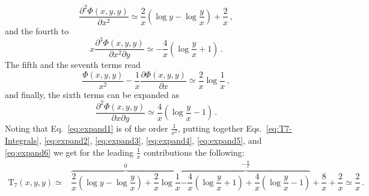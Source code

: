 \documentclass[10pt]{report}
\newcommand{\ro}[1]{\textrm{#1}}
\renewcommand{\(}{\left(}
\renewcommand{\)}{\right)}
\renewcommand{\[}{\left[}
\renewcommand{\]}{\right]}
\newcommand{\del}{\partial}
\begin{document}
\begin{equation}
    \dfrac{\del^2 \Phi(x,y,y)}{\del x^2} \simeq \dfrac{2}{x} \left( \log y - \log \dfrac{y}{x} \right) + \dfrac{2}{x} \,,
    \label{eq:expand3}
\end{equation}
and the fourth to
\begin{equation}
    x \dfrac{\del^3 \Phi(x,y,y)}{\del x^2 \del y} \simeq -\dfrac{4}{x}\left(\log \dfrac{y}{x} + 1 \right)\,.
    \label{eq:expand4}
\end{equation}
The fifth and the seventh terms read
\begin{equation}
    \dfrac{\Phi(x,y,y)}{x^2}
    -\dfrac{1}{x} \dfrac{\del \Phi(x,y,y)}{\del x} \simeq \dfrac{2}{x} \log \dfrac{1}{x} \,,
    \label{eq:expand5}
\end{equation}
and finally, the sixth terms can be expanded as
\begin{equation}
    \dfrac{\del^2 \Phi(x,y,y)}{\del x \del y} \simeq \dfrac{4}{x}\left(\log \dfrac{y}{x} -1\right)\,.
    \label{eq:expand6}
\end{equation}
Noting that Eq.~\eqref{eq:expand1} is of the order $\tfrac{1}{x^2}$, putting together Eqs.~\eqref{eq:T7-Integrals}, \eqref{eq:expand2}, \eqref{eq:expand3}, \eqref{eq:expand4}, \eqref{eq:expand5}, and \eqref{eq:expand6} we get for the leading $\tfrac{1}{x}$ contributions the following:
\begin{equation}
    \begin{aligned}
    \ro{T}_7\left(x,y,y\right) \simeq& \overbrace{\dfrac{2}{x} \( \log y - \log \dfrac{y}{x} \) + \dfrac{2}{x} \log \dfrac{1}{x}}^{0} \overbrace{-\dfrac{4}{x}\(\log \dfrac{y}{x} + 1 \) +
    \dfrac{4}{x}\(\log \dfrac{y}{x} -1\)}^{-\tfrac{8}{x}} + \dfrac{8}{x} + \dfrac{2}{x} \simeq \dfrac{2}{x}\,.
    \end{aligned}
    \label{eq:T7-expanded}
\end{equation}

\newpage



\end{document}
